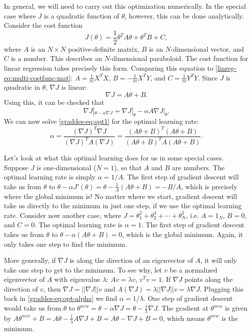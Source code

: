 \documentclass{article}
\theoremstyle{definition}
\begin{document}
In general, we will need to carry out this optimization numerically. In the special case where $J$ is a quadratic function of $\theta$, however, this can be done analytically. Consider the cost function
\begin{equation}
    J(\theta) = \frac{1}{2}\theta^TA\theta + \theta^TB + C,
\end{equation}
where $A$ is an $N\times N$ positive-definite matrix, $B$ is an $N$-dimensional vector, and $C$ is a number. This describes an $N$-dimensional paraboloid. The cost function for linear regression takes precisely this form. Comparing this equation to \eqref{linreg-eq:multi-costfunc-mat}: $A=\frac{1}{m}X^TX$, $B=-\frac{1}{m}X^TY$, and $C=\frac{1}{m}Y^TY$. Since $J$ is quadratic in $\theta$, $\nabla J$ is linear:
\begin{equation}
    \nabla J = A\theta + B.
\end{equation}
Using this, it can be checked that
\begin{equation}
    \nabla J|_{\theta - \alpha \nabla J} = \nabla J|_{\theta} - \alpha A\nabla J|_{\theta}.
\end{equation}
We can now solve \eqref{graddes-eq:opt1} for the optimal learning rate:
\begin{equation}
    \alpha
        = \frac{(\nabla J)^T\nabla J}{(\nabla J)^TA(\nabla J)}
        = \frac{(A\theta + B)^T(A\theta + B)}{(A\theta + B)^TA(A\theta + B)}.
    \label{graddes-eq:opt-alpha}
\end{equation}

Let's look at what this optimal learning does for us in some special cases. Suppose $J$ is one-dimensional ($N=1$), so that $A$ and $B$ are numbers. The optimal learning rate is simply $\alpha=1/A$. The first step of gradient descent will take us from $\theta$ to $\theta - \alpha J'(\theta) = \theta - \frac{1}{A}(A\theta+B) = -B/A$, which is precisely where the global minimum is! No matter where we start, gradient descent will take us directly to the minimum in just one step, if we use the optimal learning rate. Consider now another case, where $J=\theta_1^2+\theta_2^3+\cdots+\theta_N^2$, i.e. $A=1_N$, $B=0$, and $C=0$. The optimal learning rate is $\alpha=1$. The first step of gradient descent takes us from $\theta$ to $\theta - \alpha (A\theta+B)=0$, which is the global minimum. Again, it only takes one step to find the minimum.

More generally, if $\nabla J$ is along the direction of an eigenvector of $A$, it will only take one step to get to the minimum. To see why, let $v$ be a normalized eigenvector of $A$ with eigenvalue $\lambda$: $Av=\lambda v$, $v^Tv=1$. If $\nabla J$ points along the direction of $v$, then $\nabla J = ||\nabla J|| v$ and $A(\nabla J)=\lambda ||\nabla J|| v = \lambda \nabla J$. Plugging this back in \eqref{graddes-eq:opt-alpha} we find $\alpha=1/\lambda$. One step of gradient descent would take us from $\theta$ to $\theta^{new} = \theta-\alpha\nabla J=\theta-\frac{1}{\lambda}\nabla J$. The gradient at $\theta^{new}$ is given by $A\theta^{new}+B=A\theta-\frac{1}{\lambda}A\nabla J+B=A\theta-\nabla J+B=0$, which means $\theta^{new}$ is the minimum.
\end{document}

